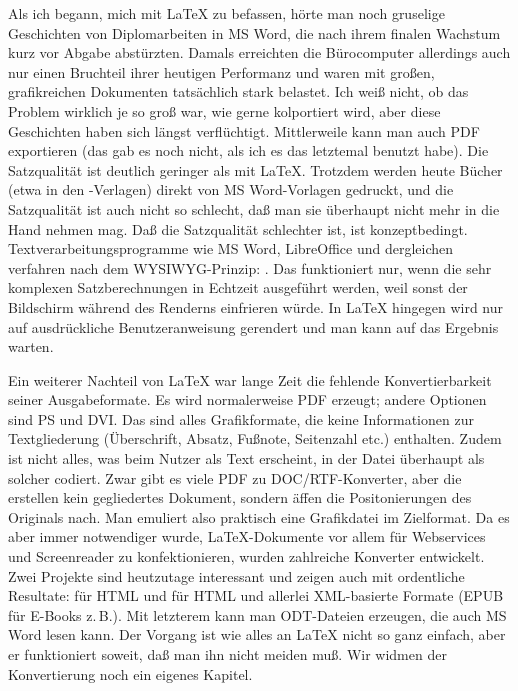 \documentclass[12pt,table]{scrreprt}
\begin{document}
Als ich begann, mich mit \LaTeX{} zu befassen, hörte man noch gruselige Geschichten von Diplomarbeiten in MS Word, die nach ihrem finalen Wachstum kurz vor Abgabe abstürzten. Damals erreichten die Bürocomputer allerdings auch nur einen Bruchteil ihrer heutigen Performanz und waren mit großen, grafikreichen Dokumenten tatsächlich stark belastet. Ich weiß nicht, ob das Problem wirklich je so groß war, wie gerne kolportiert wird, aber diese Geschichten haben sich längst verflüchtigt. Mittlerweile kann man auch PDF exportieren (das gab es noch nicht, als ich es das letztemal benutzt habe). Die Satzqualität ist deutlich geringer als mit \LaTeX. Trotzdem werden heute Bücher (etwa in den -Verlagen) direkt von MS Word-Vorlagen gedruckt, und die Satzqualität ist auch nicht so schlecht, daß man sie überhaupt nicht mehr in die Hand nehmen mag. Daß die Satzqualität schlechter ist, ist konzeptbedingt. Textverarbeitungsprogramme wie MS Word, LibreOffice und dergleichen verfahren nach dem WYSIWYG-Prinzip: . Das funktioniert nur, wenn die sehr komplexen Satzberechnungen in Echtzeit ausgeführt werden, weil sonst der Bildschirm während des Renderns  einfrieren würde. In \LaTeX{} hingegen wird nur auf ausdrückliche Benutzeranweisung gerendert und man kann auf das Ergebnis warten.

Ein weiterer Nachteil von \LaTeX{} war lange Zeit die fehlende Konvertierbarkeit seiner Ausgabeformate. Es wird normalerweise PDF erzeugt; andere Optionen sind PS und DVI. Das sind alles Grafikformate, die keine Informationen zur Textgliederung (Überschrift, Absatz, Fußnote, Seitenzahl etc.) enthalten. Zudem ist nicht alles, was beim Nutzer als Text erscheint, in der Datei überhaupt als solcher codiert. Zwar gibt es viele PDF zu DOC/RTF-Konverter, aber die erstellen kein gegliedertes Dokument, sondern äffen die Positonierungen des Originals nach. Man emuliert also praktisch eine Grafikdatei im Zielformat. Da es aber immer notwendiger wurde, \LaTeX{}-Dokumente vor allem für Webservices und Screenreader zu konfektionieren, wurden zahlreiche  Konverter entwickelt. Zwei Projekte sind heutzutage interessant und zeigen auch mit \archbib ordentliche Resultate:
\Paket{\LaTeXML{}} für HTML und  für HTML und allerlei XML-basierte Formate (EPUB für E-Books z.\,B.). Mit letzterem kann man ODT-Dateien erzeugen, die auch MS Word lesen kann. Der Vorgang ist wie alles an \LaTeX{} nicht so ganz einfach, aber er funktioniert soweit, daß man ihn nicht meiden muß. Wir widmen der Konvertierung noch ein eigenes Kapitel.
\end{document}
